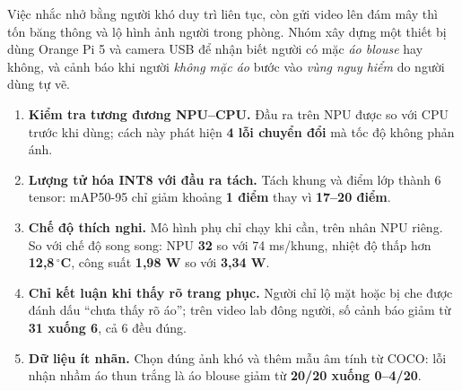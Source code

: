 \documentclass[24pt]{extarticle}
\newcommand{\num}[1]{{\bfseries\color{teal}#1}}
\begin{document}
\begin{minipage}[t]{0.485\textwidth}
\vspace{0pt}
\begin{tcolorbox}[sec,title={1. Bài toán và ý tưởng}]
Việc nhắc nhở bằng người khó duy trì liên tục, còn gửi video lên đám mây thì tốn băng thông và lộ hình ảnh người trong phòng. Nhóm xây dựng một thiết bị dùng Orange Pi 5 và camera USB để nhận biết người có mặc \emph{áo blouse} hay không, và cảnh báo khi người \emph{không mặc áo} bước vào \emph{vùng nguy hiểm} do người dùng tự vẽ.
\end{tcolorbox}

\begin{tcolorbox}[sec,title={2. Đóng góp kỹ thuật chính}]
\begin{enumerate}[leftmargin=1.4em,itemsep=2pt]
  \item \textbf{Kiểm tra tương đương NPU--CPU.} Đầu ra trên NPU được so với CPU trước khi dùng; cách này phát hiện \num{4 lỗi chuyển đổi} mà tốc độ không phản ánh.
  \item \textbf{Lượng tử hóa INT8 với đầu ra tách.} Tách khung và điểm lớp thành 6 tensor: mAP50-95 chỉ giảm khoảng \num{1 điểm} thay vì \num{17--20 điểm}.
  \item \textbf{Chế độ thích nghi.} Mô hình phụ chỉ chạy khi cần, trên nhân NPU riêng. So với chế độ song song: NPU \num{32} so với 74 ms/khung, nhiệt độ thấp hơn \num{12,8\,$^\circ$C}, công suất \num{1,98 W} so với \num{3,34 W}.
  \item \textbf{Chỉ kết luận khi thấy rõ trang phục.} Người chỉ lộ mặt hoặc bị che được đánh dấu ``chưa thấy rõ áo''; trên video lab đông người, số cảnh báo giảm từ \num{31 xuống 6}, cả 6 đều đúng.
  \item \textbf{Dữ liệu ít nhãn.} Chọn đúng ảnh khó và thêm mẫu âm tính từ COCO: lỗi nhận nhầm áo thun trắng là áo blouse giảm từ \num{20/20 xuống 0--4/20}.
\end{enumerate}
\end{tcolorbox}
\end{minipage}\hfill
\end{document}
